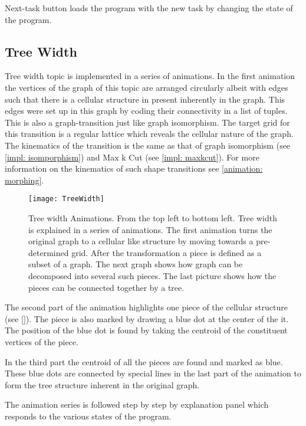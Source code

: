 Next-task button loads the program with the new task by changing the state of
the program.

\subsection{Tree Width}
Tree width topic is implemented in a series of animations.  In the first
animation the vertices of the graph of this topic are arranged circularly
albeit with edges such that there is a cellular structure in present inherently
in the graph. This edges were set up in this graph by coding their connectivity
in a list of tuples.
This is also a graph-transition just like graph isomorphism. The target grid
for this transition is a regular lattice which reveals the cellular nature of
the graph. The kinematics of the transition is the same as that of graph
isomorphism (see \autoref{impl: isomporphism}) and Max k Cut (see
\autoref{impl: maxkcut}). For more information on the kinematics of such shape
transitions see \autoref{animation: morphing}.

\begin{figure}[ht]
\centering
\texttt{[image: TreeWidth]}
\caption{
        Tree width Animations. From the top left to bottom left. Tree width is
        explained in a series of animations. The first animation turns the
        original graph to a cellular like structure by moving towards a
        pre-determined grid.  After the transformation a piece is defined as a
        subset of a graph.  The next graph shows how graph can be decomposed
        into several such pieces.  The last picture shows how the pieces can be
        connected together by a tree.
        }
\label{animationfigure: vertexCover}
\end{figure}

The second part of the animation highlights one piece of the cellular structure
(see \autoref{}). The piece is also marked by drawing a blue dot at the center
of the it. The position of the blue dot is found by  taking the centroid of the
constituent vertices of the piece.

In the third part the centroid of all the pieces are found and marked as blue.
These blue dots are connected by special lines in the last part of the
animation to form the tree structure inherent in the original graph.

The animation series is followed step by step by explanation panel which responds
to the various states of the program.


